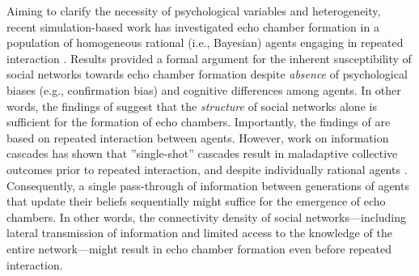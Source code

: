 \documentclass[doc,floatsintext]{apa6}
\begin{document}
Aiming to clarify the necessity of psychological variables and heterogeneity, recent simulation-based work has investigated echo chamber formation in a population of homogeneous rational (i.e., Bayesian) agents engaging in repeated interaction \citep{madsen2018large, madsen2017growing}. Results provided a formal argument for the inherent susceptibility of social networks towards echo chamber formation despite \emph{absence} of psychological biases (e.g., confirmation bias) and cognitive differences among agents. In other words, the findings of \cite{madsen2018large} suggest that the \textit{structure} of social networks alone is sufficient for the formation of echo chambers. 
Importantly, the findings of \citep{madsen2018large, madsen2017growing} are based on repeated interaction between agents. However, work on information cascades has shown that ''single-shot'' cascades result in maladaptive collective outcomes prior to repeated interaction, and despite individually rational agents \citep{bikhchandani1992theory, pilditch2017opinion}. Consequently, a single pass-through of information between generations of agents that update their beliefs sequentially might suffice for the emergence of echo chambers. In other words, the connectivity density of social networks---including lateral transmission of information and limited access to the knowledge of the entire network---might result in echo chamber formation even before repeated interaction.
\end{document}
